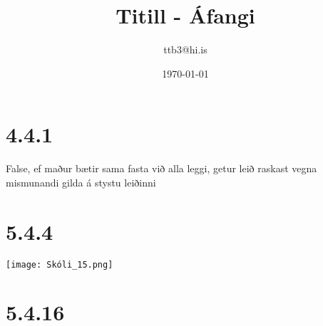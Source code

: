\documentclass{article}
\title{Titill - Áfangi}
\author{ttb3@hi.is}
\date{\today}
\begin{document}
\maketitle


\section*{4.4.1}
False, ef maður bætir sama fasta við alla leggi, getur leið raskast vegna mismunandi gilda á stystu leiðinni

\section*{5.4.4}
\texttt{[image: Skóli\_15.png]}

\section*{5.4.16}
\end{document}
